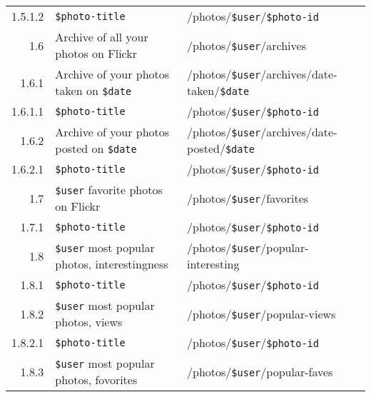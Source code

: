 \documentclass[12pt,a4paper]{article}
\newcommand{\var}[1]{\texttt{\${#1}}}
\begin{document}
\begin{table}[h!b!p!]
\begin{adjustwidth}{-6em}{-6em}
\begin{center}
\begin{small}
\begin{tabular}{|r|l|l|}
                    1.5.1.2 &
                    \var{photo-title} &
                    /photos/\var{user}/\var{photo-id} \\

                1.6 &
                Archive of all your photos on Flickr &
                /photos/\var{user}/archives \\

                  1.6.1 &
                  Archive of your photos taken on \var{date} &
                  /photos/\var{user}/archives/date-taken/\var{date} \\

                    1.6.1.1 &
                    \var{photo-title} &
                    /photos/\var{user}/\var{photo-id} \\

                  1.6.2 &
                  Archive of your photos posted on \var{date} &
                  /photos/\var{user}/archives/date-posted/\var{date} \\

                    1.6.2.1 &
                    \var{photo-title} &
                    /photos/\var{user}/\var{photo-id} \\

                1.7 &
                \var{user} favorite photos on Flickr &
                /photos/\var{user}/favorites \\

                  1.7.1 &
                  \var{photo-title} &
                  /photos/\var{user}/\var{photo-id} \\

                1.8 &
                \var{user} most popular photos, interestingness &
                /photos/\var{user}/popular-interesting \\

                  1.8.1 &
                  \var{photo-title} &
                  /photos/\var{user}/\var{photo-id} \\

                  1.8.2 &
                  \var{user} most popular photos, views &
                  /photos/\var{user}/popular-views \\

                    1.8.2.1 &
                    \var{photo-title} &
                    /photos/\var{user}/\var{photo-id} \\

                  1.8.3 &
                  \var{user} most popular photos, fovorites &
                  /photos/\var{user}/popular-faves \\


\end{tabular}
\end{small}
\end{center}
\end{adjustwidth}
\end{table}
\end{document}
